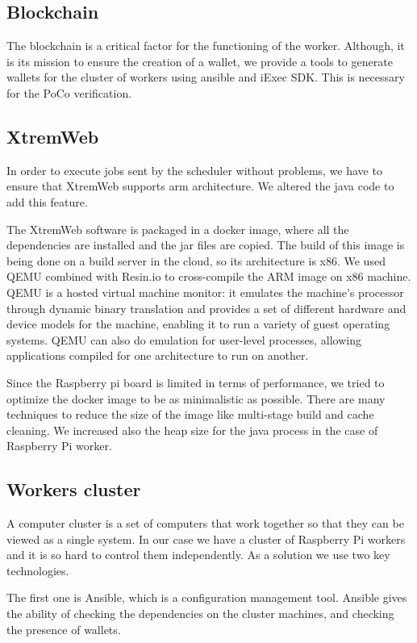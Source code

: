     \subsection{Blockchain}
    The blockchain is a critical factor for the functioning of the worker. Although, it is its mission
    to ensure the creation of a wallet, we provide a tools to generate wallets for the cluster of workers
    using ansible and iExec SDK. This is necessary for the PoCo verification.

    \subsection{XtremWeb}
    In order to execute jobs sent by the scheduler without problems, we have to ensure that XtremWeb supports
    arm architecture. We altered the java code to add this feature.

    The XtremWeb software is packaged in a docker image, where all the dependencies are installed and the jar
    files are copied. The build of this image is being done on a build server in the cloud, so its architecture
    is x86. We used QEMU combined with Resin.io to cross-compile the ARM image on x86 machine.
    QEMU is a hosted virtual machine monitor: it emulates the machine's processor through dynamic binary
    translation and provides a set of different hardware and device models for the machine, enabling it to
    run a variety of guest operating systems. QEMU can also do emulation for user-level processes, allowing
    applications compiled for one architecture to run on another.

    Since the Raspberry pi board is limited in terms of performance, we tried to optimize the docker image to be
    as minimalistic as possible. There are many techniques to reduce the size of the image like multi-stage
    build and cache cleaning. We increased also the heap size for the java process in the case of
    Raspberry Pi worker.

    \subsection{Workers cluster}
    A computer cluster is a set of computers that work together so that they can be viewed as a single system.
    In our case we have a cluster of Raspberry Pi workers and it is so hard to control them independently.
    As a solution we use two key technologies.

    The first one is Ansible, which is a configuration management tool.
    Ansible gives the ability of checking the dependencies on the cluster machines, and checking the presence
    of wallets.

